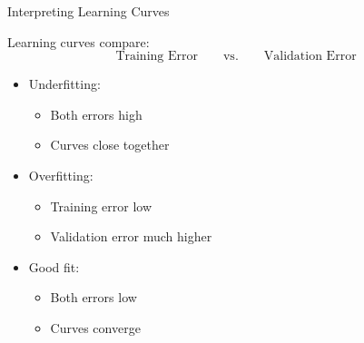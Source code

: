 \documentclass[aspectratio=169]{beamer}
\begin{document}
\begin{frame}{Interpreting Learning Curves}
	
	Learning curves compare:
	\[
	\text{Training Error}
	\qquad \text{vs.} \qquad
	\text{Validation Error}
	\]
	
	\vspace{0.7em}
	
	\begin{itemize}
		\item Underfitting:
		\begin{itemize}
			\item Both errors high
			\item Curves close together
		\end{itemize}
		
		\vspace{0.5em}
		
		\item Overfitting:
		\begin{itemize}
			\item Training error low
			\item Validation error much higher
		\end{itemize}
		
		\vspace{0.5em}
		
		\item Good fit:
		\begin{itemize}
			\item Both errors low
			\item Curves converge
		\end{itemize}
	\end{itemize}
	
\end{frame}

\end{document}

